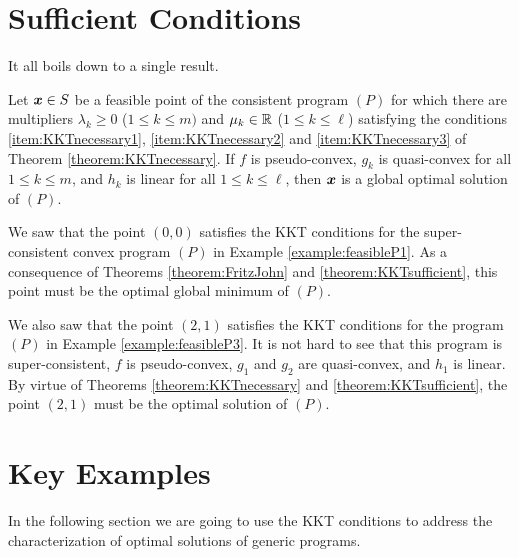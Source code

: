 
\section{Sufficient Conditions}

It all boils down to a single result.

\begin{theorem}\label{theorem:KKTsufficient}
Let $\boldsymbol{x} \in S$ be a feasible point of the consistent program $(P)$ for which there are multipliers $\lambda_k \geq 0$ ($1\leq k \leq m)$ and $\mu_k \in \mathbb{R}$ ($1\leq k \leq \ell$) satisfying the conditions \ref{item:KKTnecessary1}, \ref{item:KKTnecessary2} and \ref{item:KKTnecessary3} of Theorem \ref{theorem:KKTnecessary}. If $f$ is pseudo-convex, $g_k$ is quasi-convex for all $1\leq k \leq m$, and $h_k$ is linear for all $1\leq k \leq \ell$, then $\boldsymbol{x}$ is a global optimal solution of $(P)$.
\end{theorem}

\begin{example}
We saw that the point $(0,0)$ satisfies the KKT conditions for the super-consistent convex program $(P)$ in Example \ref{example:feasibleP1}.  As a consequence of Theorems \ref{theorem:FritzJohn} and \ref{theorem:KKTsufficient}, this point must be the optimal global minimum of $(P)$.

We also saw that the point $(2,1)$ satisfies the KKT conditions for the program $(P)$ in Example \ref{example:feasibleP3}.  It is not hard to see that this program is super-consistent, $f$ is pseudo-convex, $g_1$ and $g_2$ are quasi-convex, and $h_1$ is linear.  By virtue of Theorems \ref{theorem:KKTnecessary} and \ref{theorem:KKTsufficient}, the point $(2,1)$ must be the optimal solution of $(P)$.
\end{example}

\section*{Key Examples}
In the following section we are going to use the KKT conditions to address the characterization of optimal solutions of generic programs. 


